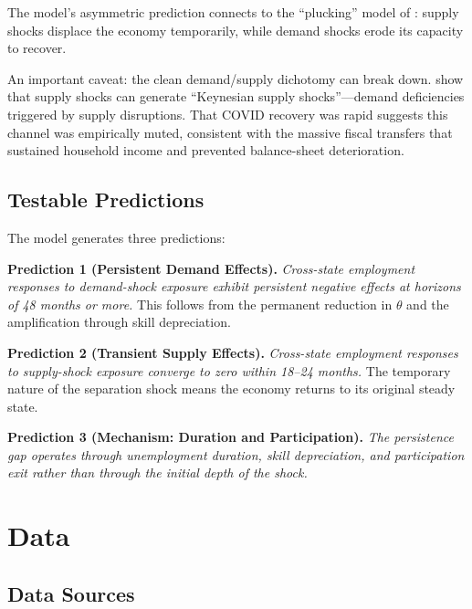 \documentclass[12pt]{article}
\begin{document}
The model's asymmetric prediction connects to the ``plucking'' model of \citet{dupraz2022plucking}: supply shocks displace the economy temporarily, while demand shocks erode its capacity to recover.

An important caveat: the clean demand/supply dichotomy can break down. \citet{guerrieri2022macroeconomic} show that supply shocks can generate ``Keynesian supply shocks''---demand deficiencies triggered by supply disruptions. That COVID recovery was rapid suggests this channel was empirically muted, consistent with the massive fiscal transfers that sustained household income and prevented balance-sheet deterioration.

\subsection{Testable Predictions}

The model generates three predictions:

\medskip

\noindent \textbf{Prediction 1 (Persistent Demand Effects).} \textit{Cross-state employment responses to demand-shock exposure exhibit persistent negative effects at horizons of 48 months or more.} This follows from the permanent reduction in $\theta$ and the amplification through skill depreciation.

\medskip

\noindent \textbf{Prediction 2 (Transient Supply Effects).} \textit{Cross-state employment responses to supply-shock exposure converge to zero within 18--24 months.} The temporary nature of the separation shock means the economy returns to its original steady state.

\medskip

\noindent \textbf{Prediction 3 (Mechanism: Duration and Participation).} \textit{The persistence gap operates through unemployment duration, skill depreciation, and participation exit rather than through the initial depth of the shock.}


\section{Data}
\label{sec:data}

\subsection{Data Sources}
\end{document}
